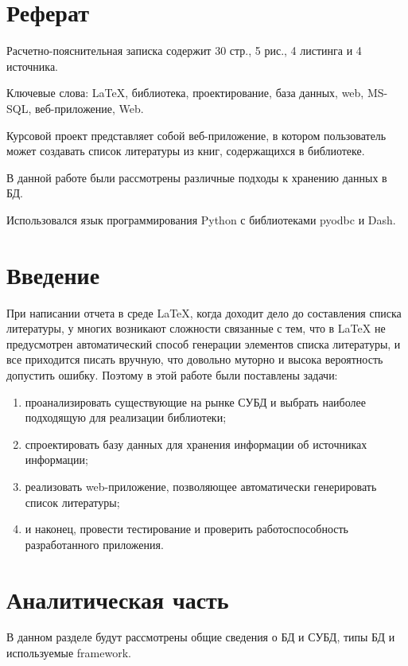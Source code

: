 \section*{Реферат}%

Расчетно-пояснительная записка содержит 30 стр., 5 рис., 4 листинга и 4 источника.

Ключевые слова: LaTeX, библиотека, проектирование, база данных, web, MS-SQL, веб-приложение, Web.

Курсовой проект представляет собой веб-приложение, в котором пользователь может создавать список литературы из книг, содержащихся в библиотеке.

В данной работе были рассмотрены различные подходы к хранению данных в БД.

Использовался язык программирования Python с библиотеками pyodbc и Dash.
\newpage
\section*{Введение}%

При написании отчета в среде LaTeX, когда доходит дело до составления списка литературы, у многих возникают сложности связанные с тем, что в LaTeX не предусмотрен автоматический способ генерации элементов списка литературы, и все приходится писать вручную, что довольно муторно и высока вероятность допустить ошибку. Поэтому в этой работе были поставлены задачи:
\begin{enumerate}
	\item проанализировать существующие на рынке СУБД и выбрать наиболее подходящую для реализации библиотеки;
	\item спроектировать базу данных для хранения информации об источниках информации;
	\item реализовать web-приложение, позволяющее автоматически генерировать список литературы;
	\item и наконец, провести тестирование и проверить работоспособность разработанного приложения.

\end{enumerate}\newpage
\section*{Аналитическая часть}%

В данном разделе будут рассмотрены общие сведения о БД и СУБД, типы БД и используемые framework. 

